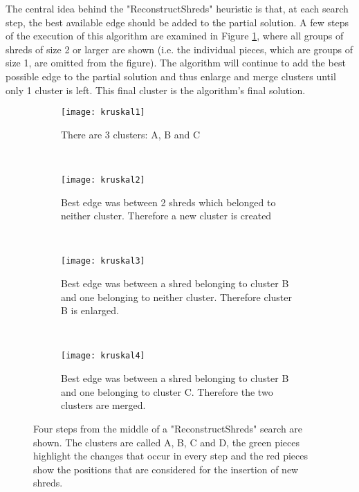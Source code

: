 The central idea behind the "ReconstructShreds" heuristic is that, at each search step, the best available edge should be added to the partial solution. A few steps of the execution of this algorithm are examined in Figure \ref{fig:kruskal}, where all groups of shreds of size 2 or larger are shown (i.e. the individual pieces, which are groups of size 1, are omitted from the figure). The algorithm will continue to add the best possible edge to the partial solution and thus enlarge and merge clusters until only 1 cluster is left. This final cluster is the algorithm's final solution. 

\begin{figure}[h]
        \centering
        \begin{subfigure}[b]{0.4\textwidth}
                \centering
                \texttt{[image: kruskal1]}
                \caption{There are 3 clusters: A, B and C \vspace{2\baselineskip}}
        \end{subfigure}
        ~ 
        \begin{subfigure}[b]{0.4\textwidth}
                \centering
                \texttt{[image: kruskal2]}
                \caption{Best edge was between 2 shreds which belonged to neither cluster. Therefore a new cluster is created}
        \end{subfigure}
        ~ 
        \begin{subfigure}[b]{0.4\textwidth}
                \centering
                \texttt{[image: kruskal3]}
                \caption{Best edge was between a shred belonging to cluster B and one belonging to neither cluster. Therefore cluster B is enlarged.}
        \end{subfigure}
        ~ 
        \begin{subfigure}[b]{0.4\textwidth}
                \centering
                \texttt{[image: kruskal4]}
                \caption{Best edge was between a shred belonging to cluster B and one belonging to cluster C. Therefore the two clusters are merged.}
        \end{subfigure}
        \caption{Four steps from the middle of a "ReconstructShreds" search are shown. The clusters are called A, B, C and D, the green pieces highlight the changes that occur in every step and the red pieces show the positions that are considered for the insertion of new shreds.}
        \label{fig:kruskal}
\end{figure}

